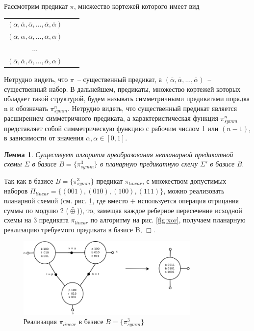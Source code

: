\documentclass[12pt]{extarticle}
\newtheorem{lemma}[theorem]{Лемма}
\newenvironment{proof}[1][Доказательство.]{\begin{trivlist}
\item[\hskip \labelsep {\bfseries #1}]}{\end{trivlist}}
\newenvironment{definition}[1][Определение.]{\begin{trivlist}
\item[\hskip \labelsep {\bfseries #1}]}{\end{trivlist}}
\begin{document}
\begin{definition}
Рассмотрим предикат 
$\pi$, множество кортежей которого имеет вид
\begin{center}
\begin{tabular}{ccc}
$(\alpha, \bar{\alpha}, \bar{\alpha}, \dots, \bar{\alpha}, \bar{\alpha})$\\
$(\bar{\alpha}, \alpha, \bar{\alpha}, \dots, \bar{\alpha}, \bar{\alpha})$\\
$\ldots$\\
$(\bar{\alpha}, \bar{\alpha}, \bar{\alpha}, \dots, \bar{\alpha}, \alpha)$
\end{tabular}
\end{center}

Нетрудно видеть, что $\pi$~-- существенный предикат, а
$(\bar{\alpha}, \bar{\alpha}, \dots, \bar{\alpha})$~-- существенный набор. 
В дальнейшем, предикаты, множество кортежей которых обладает такой структурой, будем называть 
симметричными предикатами порядка n и обозначать $\pi_{symm}^n$. Нетрудно видеть, что существенный предикат является 
расширением симметричного предиката, а характеристическая функция $\pi_{symm}^n$ представляет собой симметрическую функцию
с рабочим числом 1 или $(n-1)$, в зависимости от значения $\alpha, \alpha \in [0,1]$.
\end{definition}

\begin{lemma}
\label{eq:planar_algo}
Существует алгоритм преобразования непланарной предикатной схемы $\Sigma$ в базисе $B=\{\pi_{symm}^3\}$
в планарную предикатную схему $\Sigma'$ в базисе B.
\end{lemma}
\begin{proof}
Так как в базисе $B=\{\pi_{symm}^3\}$ предикат 
$\pi_{linear}$, с множеством допустимых наборов $\Pi_{linear} = \{ (001), (010), (100), (111) \}$, 
можно реализовать планарной схемой (см. рис. \ref{fig:linear_3}, где вместо $+$ используется операция
отрицания суммы по модулю 2 ($\bar{\oplus}$)), то, замещая каждое реберное пересечение исходной схемы
на 3 предиката $\pi_{linear}$ по алгоритму на рис. \ref{fig:xor}, получаем планарную реализацию требуемого предиката
в базисе B, $\Box$.
\end{proof}

\begin{figure}[htb]
\centering
\includegraphics[width=0.8\textwidth]{linear.png}
\caption{Реализация $\pi_{linear}$ в базисе $B = \{ \pi_{symm}^3 \}$}
\label{fig:linear_3}
\end{figure}
\end{document}
